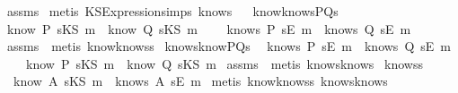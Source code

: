\begin{isabellebody}
\isadelimproof
\endisadelimproof
\isatagproof
{}\isamarkupfalse \ assms\isanewline
{}\isamarkupfalse \ {\isacharparenleft}metis\ KS{}Expression{\isachardot}simps{\isacharparenleft}{}{\isacharparenright}\ know{}s{\isacharparenright}\endisatagproof
{\isafoldproof}\isadelimproof
\ \isanewline
\endisadelimproof
\isanewline
{}\isamarkupfalse \ know{}knowsPQ{\isacharunderscore}s{\isacharcolon}\ \isanewline
{}\ {\isachardoublequoteopen}know\ P\ {\isacharparenleft}sKS\ m{\isacharparenright}\ {\isasymor}\ know\ Q\ {\isacharparenleft}sKS\ m{\isacharparenright}{\isachardoublequoteclose}\isanewline
{}\ \ \ \ {\isachardoublequoteopen}knows\ P\ {\isacharbrackleft}sE\ m{\isacharbrackright}\ {\isasymor}\ knows\ Q\ {\isacharbrackleft}sE\ m{\isacharbrackright}{\isachardoublequoteclose}\ \isanewline
\isadelimproof
\endisadelimproof
\isatagproof
{}\isamarkupfalse \ assms\ \isamarkupfalse \ {\isacharparenleft}metis\ know{}knows{\isacharunderscore}s{\isacharparenright}\endisatagproof
{\isafoldproof}\isadelimproof
\isanewline
\endisadelimproof
\isanewline
{}\isamarkupfalse \ knows{}knowPQ{\isacharunderscore}s{\isacharcolon}\ \isanewline
{}\ {\isachardoublequoteopen}knows\ P\ {\isacharbrackleft}sE\ m{\isacharbrackright}\ {\isasymor}\ knows\ Q\ {\isacharbrackleft}sE\ m{\isacharbrackright}{\isachardoublequoteclose}\isanewline
{}\ \ \ \ {\isachardoublequoteopen}know\ P\ {\isacharparenleft}sKS\ m{\isacharparenright}\ {\isasymor}\ know\ Q\ {\isacharparenleft}sKS\ m{\isacharparenright}{\isachardoublequoteclose}\isanewline
\isadelimproof
\endisadelimproof
\isatagproof
{}\isamarkupfalse \ assms\ \isamarkupfalse \ {\isacharparenleft}metis\ knows{}know{\isacharunderscore}s{\isacharparenright}\endisatagproof
{\isafoldproof}\isadelimproof
\isanewline
\endisadelimproof
\isanewline
{}\isamarkupfalse \ knows{}s{\isacharcolon}\isanewline
\ \ {\isachardoublequoteopen}know\ A\ {\isacharparenleft}sKS\ m{\isacharparenright}\ {\isacharequal}\ knows\ A\ {\isacharbrackleft}sE\ m{\isacharbrackright}{\isachardoublequoteclose}\isanewline
\isadelimproof
\endisadelimproof
\isatagproof
{}\isamarkupfalse \ {\isacharparenleft}metis\ know{}knows{\isacharunderscore}s\ knows{}know{\isacharunderscore}s{\isacharparenright}\endisatagproof
{\isafoldproof}\isadelimproof
\ \isanewline

\end{isabellebody}
